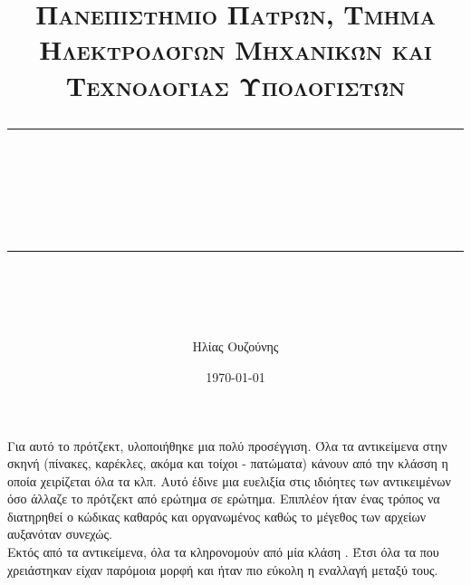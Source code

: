 \documentclass[11pt]{scrartcl} %
\title{	
	\normalfont\normalsize
	\textsc{Πανεπιστήμιο Πατρών, Τμήμα Ηλεκτρολόγων Μηχανικών και Τεχνολογίας Υπολογιστών}\\ %
	\vspace{25pt} %
	\rule{\linewidth}{0.5pt}\\ %
	\vspace{20pt} %
	{\huge \en{ART GALLERY}}\\ %
	\vspace{12pt} %
	\rule{\linewidth}{2pt}\\ %
	\vspace{12pt} %
}
\author{\LARGE Ηλίας Ουζούνης \\ \en{up1083749}} %
\date{\normalsize\today} %
\begin{document}
\maketitle

\newpage

\section*{}
	Για αυτό το πρότζεκτ, υλοποιήθηκε μια πολύ  προσέγγιση. Όλα τα αντικείμενα στην σκηνή (πίνακες, καρέκλες,
ακόμα και τοίχοι - πατώματα) κάνουν  από την κλάσση  η οποία χειρίζεται όλα τα 
κλπ. Αυτό έδινε μια ευελιξία στις ιδιόητες των αντικειμένων όσο άλλαζε το πρότζεκτ από ερώτημα σε ερώτημα. 
Επιπλέον ήταν ένας τρόπος να διατηρηθεί ο κώδικας καθαρός και οργανωμένος καθώς το μέγεθος των αρχείων αυξανόταν συνεχώς.\\

Εκτός από τα αντικείμενα, όλα τα  κληρονομούν από μία κλάση . Έτσι όλα τα  που χρειάστηκαν είχαν παρόμοια
μορφή και ήταν πιο εύκολη η εναλλαγή μεταξύ τους.\\

\section{}
\end{document}
